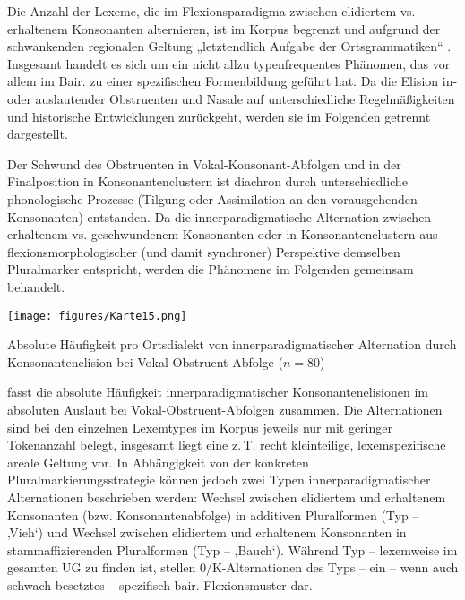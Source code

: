 Die Anzahl der Lexeme, die im Flexionsparadigma zwischen elidiertem vs. erhaltenem Konsonanten alternieren, ist im Korpus begrenzt und aufgrund der schwankenden regionalen Geltung „letztendlich Aufgabe der Ortsgrammatiken“ \citep[124]{Rowley1997}. Insgesamt handelt es sich um ein nicht allzu typenfrequentes Phänomen, das vor allem im Bair. zu einer spezifischen Formenbildung geführt hat. Da die Elision in- oder auslautender Obstruenten und Nasale auf unterschiedliche Regelmäßigkeiten und historische Entwicklungen zurückgeht, werden sie im Folgenden getrennt dargestellt.


Der Schwund des Obstruenten in Vokal-Konsonant-Abfolgen und in der Finalposition in Konsonantenclustern ist diachron durch unterschiedliche phonologische Prozesse (Tilgung oder Assimilation an den vorausgehenden Konsonanten) entstanden. Da die innerparadigmatische Alternation zwischen erhaltenem vs. geschwundenem Konsonanten oder in Konsonantenclustern aus flexionsmorphologischer (und damit synchroner) Perspektive demselben Pluralmarker entspricht, werden die Phänomene im Folgenden gemeinsam behandelt.


\begin{map}
\texttt{[image: figures/Karte15.png]}
\caption{Absolute Häufigkeit pro Ortsdialekt von innerparadigmatischer Alternation durch Konsonantenelision bei Vokal-Obstruent-Abfolge ($n=80$)}
\label{map:15}
\end{map}

 fasst die absolute Häufigkeit innerparadigmatischer Konsonantenelisionen im absoluten Auslaut bei Vokal-Obstruent-Abfolgen zusammen. Die Alternationen sind bei den einzelnen Lexemtypes im Korpus jeweils nur mit geringer Tokenanzahl belegt, insgesamt liegt eine z.\,T. recht kleinteilige, lexemspezifische areale Geltung vor. In Abhängigkeit von der konkreten Pluralmarkierungsstrategie können jedoch zwei Typen innerparadigmatischer Alternationen beschrieben werden: Wechsel zwischen elidiertem und erhaltenem Konsonanten (bzw. Konsonantenabfolge) in additiven Pluralformen (Typ  --  ‚Vieh‘) und Wechsel zwischen elidiertem und erhaltenem Konsonanten in stammaffizierenden Pluralformen (Typ  --  ‚Bauch‘). Während Typ  --  lexemweise im gesamten UG zu finden ist, stellen 0/K-Alternationen des Typs  --  ein -- wenn auch schwach besetztes -- spezifisch bair. Flexionsmuster dar.

